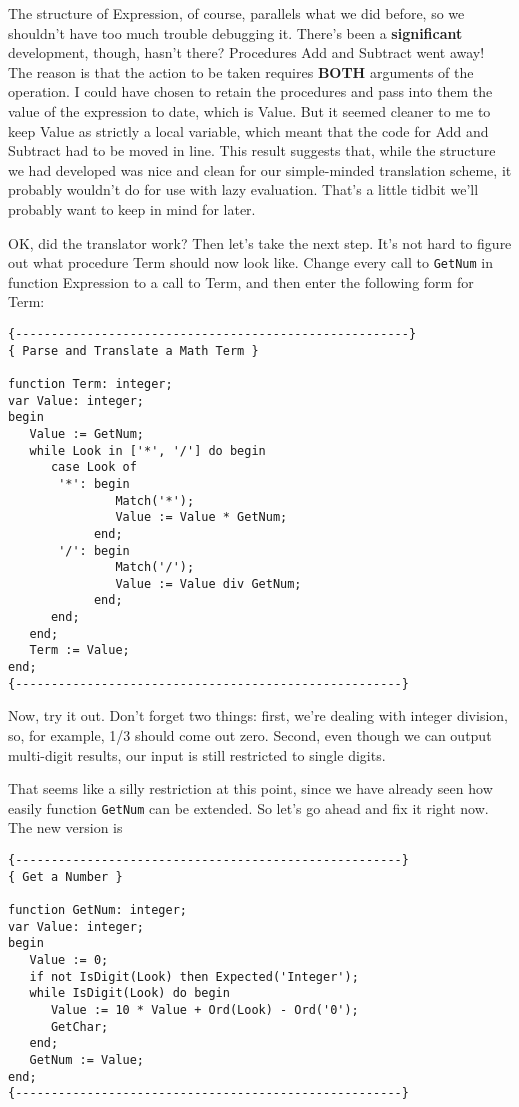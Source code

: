 The structure of Expression, of  course, parallels  what  we did before, so  we  shouldn't have too much  trouble  debugging  it. There's  been  a  {\bfseries significant}  development, though, hasn't there?  Procedures Add and Subtract went away!  The reason  is  that  the action to be taken  requires {\bfseries BOTH} arguments of the operation. I could have chosen to retain the procedures and pass into them the value of the expression to date, which  is Value. But it seemed cleaner to me to  keep  Value as strictly a local variable, which meant that the code for Add and Subtract had to be moved in line. This result suggests  that, while the structure we had developed was nice and  clean  for our simple-minded translation scheme, it probably  wouldn't do for use with lazy  evaluation. That's  a little tidbit we'll probably want to keep in mind for later.

OK, did the translator work?  Then let's  take  the  next  step. It's not hard to  figure  out what procedure Term should now look like. Change every call to {\tt GetNum} in function  Expression  to  a call to Term, and then enter the following form for Term:

\begin{verbatim}
{-------------------------------------------------------}
{ Parse and Translate a Math Term }

function Term: integer;
var Value: integer;
begin
   Value := GetNum;
   while Look in ['*', '/'] do begin
      case Look of
       '*': begin
               Match('*');
               Value := Value * GetNum;
            end;
       '/': begin
               Match('/');
               Value := Value div GetNum;
            end;
      end;
   end;
   Term := Value;
end;
{------------------------------------------------------}
\end{verbatim}

Now, try it out. Don't forget two things: first, we're dealing with integer division, so, for example, 1/3 should come out zero. Second, even  though we can output multi-digit results, our input is still restricted to single digits.

That seems like a silly restriction at this point, since  we have already  seen how easily function {\tt GetNum} can  be  extended. So let's go ahead and fix it right now. The new version is

\begin{verbatim}
{------------------------------------------------------}
{ Get a Number }

function GetNum: integer;
var Value: integer;
begin
   Value := 0;
   if not IsDigit(Look) then Expected('Integer');
   while IsDigit(Look) do begin
      Value := 10 * Value + Ord(Look) - Ord('0');
      GetChar;
   end;
   GetNum := Value;
end;
{------------------------------------------------------}
\end{verbatim}

